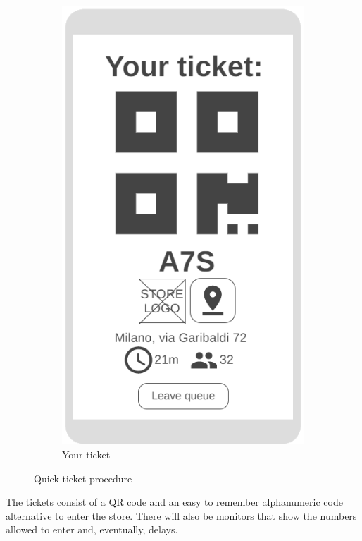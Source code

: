 \begin{figure}[h!]
\begin{subfigure}[b]{0.3\textwidth}
		\includegraphics[width=\linewidth]{../Diagrams/WireframesCLup/Ticket.png}
		\caption{Your ticket}
		\label{fig:WfTicket}
	\end{subfigure}
	\caption{Quick ticket procedure}
	\label{fig:Wireframes}
\end{figure}
The tickets consist of a QR code and an easy to remember alphanumeric code alternative to enter the store. There will also be monitors that show the numbers allowed to enter and, eventually, delays.\newline
